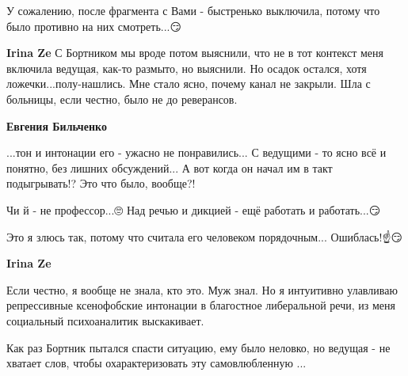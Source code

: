 \begin{itemize}
У сожалению, после фрагмента с Вами - быстренько выключила, потому что было
противно на них смотреть...😏🤦

\begin{itemize}
 
\textbf{Irina Ze} С Бортником мы вроде потом выяснили, что не в тот контекст
меня включила ведущая, как-то размыто, но выяснили. Но осадок остался, хотя
ложечки...полу-нашлись. Мне стало ясно, почему канал не закрыли. Шла с
больницы, если честно, было не до реверансов.

 
\textbf{Евгения Бильченко}

...тон и интонации его - ужасно не понравились... С ведущими - то ясно всё и
понятно, без лишних обсуждений... А вот когда он начал им в такт подыгрывать!?
Это что было, вообще?!

Чи й - не профессор...🙄 Над речью и дикцией - ещё работать и работать...😏

Это я злюсь так, потому что считала его человеком порядочным... Ошиблась!☝️😏

 
\textbf{Irina Ze} 

Если честно, я вообще не знала, кто это. Муж знал. Но я интуитивно улавливаю
репрессивные ксенофобские интонации в благостное либеральной речи, из меня
социальный психоаналитик выскакивает.

 
Как раз Бортник пытался спасти ситуацию, ему было неловко, но ведущая - не хватает слов, чтобы охарактеризовать эту самовлюбленную ...


\end{itemize}
\end{itemize}
